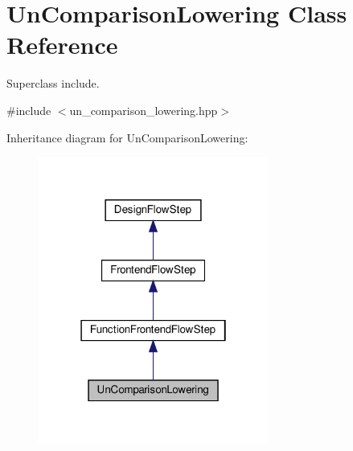 \hypertarget{classUnComparisonLowering}{}\section{Un\+Comparison\+Lowering Class Reference}
\label{classUnComparisonLowering}


Superclass include.  




{\ttfamily \#include $<$un\+\_\+comparison\+\_\+lowering.\+hpp$>$}



Inheritance diagram for Un\+Comparison\+Lowering\+:
\nopagebreak
\begin{figure}[H]
\begin{center}
\leavevmode
\includegraphics[width=214pt]{d2/dfe/classUnComparisonLowering__inherit__graph}
\end{center}
\end{figure}


